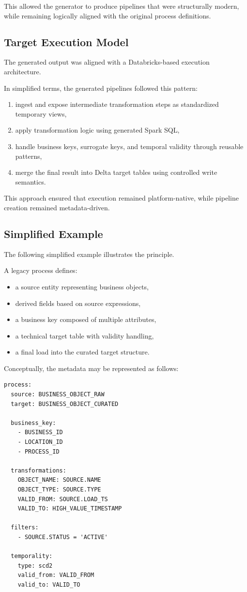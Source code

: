 \documentclass[11pt,a4paper]{article}
\begin{document}
This allowed the generator to produce pipelines that were structurally modern, while remaining logically aligned with the original process definitions.

\subsection{Target Execution Model}

The generated output was aligned with a Databricks-based execution architecture.

In simplified terms, the generated pipelines followed this pattern:
\begin{enumerate}
  \item ingest and expose intermediate transformation steps as standardized temporary views,
  \item apply transformation logic using generated Spark SQL,
  \item handle business keys, surrogate keys, and temporal validity through reusable patterns,
  \item merge the final result into Delta target tables using controlled write semantics.
\end{enumerate}

This approach ensured that execution remained platform-native, while pipeline creation remained metadata-driven.

\subsection{Simplified Example}

The following simplified example illustrates the principle.

A legacy process defines:
\begin{itemize}
  \item a source entity representing business objects,
  \item derived fields based on source expressions,
  \item a business key composed of multiple attributes,
  \item a technical target table with validity handling,
  \item a final load into the curated target structure.
\end{itemize}

Conceptually, the metadata may be represented as follows:

\begin{lstlisting}[style=hfcode,caption={Simplified metadata representation.}]
process:
  source: BUSINESS_OBJECT_RAW
  target: BUSINESS_OBJECT_CURATED

  business_key:
    - BUSINESS_ID
    - LOCATION_ID
    - PROCESS_ID

  transformations:
    OBJECT_NAME: SOURCE.NAME
    OBJECT_TYPE: SOURCE.TYPE
    VALID_FROM: SOURCE.LOAD_TS
    VALID_TO: HIGH_VALUE_TIMESTAMP

  filters:
    - SOURCE.STATUS = 'ACTIVE'

  temporality:
    type: scd2
    valid_from: VALID_FROM
    valid_to: VALID_TO
\end{lstlisting}
\end{document}
